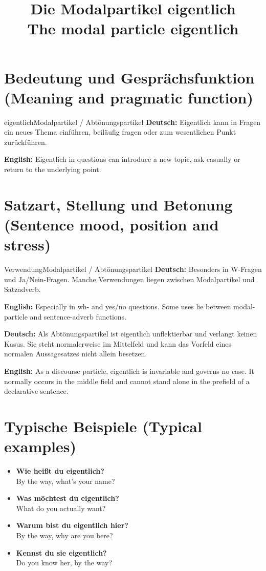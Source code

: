 \documentclass[a4paper,11pt]{article}
\title{Die Modalpartikel \glqq eigentlich\grqq\\{\large\textnormal{The modal particle eigentlich}}}
\date{}
\newcommand{\GermanText}[1]{\textbf{Deutsch: }#1\par}
\newcommand{\EnglishText}[1]{{\small\color{SoftGray}\textbf{English: }#1\par}}
\newcommand{\ExampleItem}[2]{\item \textbf{#1}\\{\small\color{SoftGray}#2}}
\begin{document}
\maketitle
\tableofcontents
\section{Bedeutung und Gesprächsfunktion \textnormal{(Meaning and pragmatic function)}}
\begin{grammarentry}{eigentlich}{Modalpartikel / Abtönungspartikel}
\GermanText{Eigentlich kann in Fragen ein neues Thema einführen, beiläufig fragen oder zum wesentlichen Punkt zurückführen.}
\EnglishText{Eigentlich in questions can introduce a new topic, ask casually or return to the underlying point.}
\end{grammarentry}
\section{Satzart, Stellung und Betonung \textnormal{(Sentence mood, position and stress)}}
\begin{grammarentry}{Verwendung}{Modalpartikel / Abtönungspartikel}
\GermanText{Besonders in W-Fragen und Ja/Nein-Fragen. Manche Verwendungen liegen zwischen Modalpartikel und Satzadverb.}
\EnglishText{Especially in wh- and yes/no questions. Some uses lie between modal-particle and sentence-adverb functions.}
\end{grammarentry}
\GermanText{Als Abtönungspartikel ist eigentlich unflektierbar und verlangt keinen Kasus. Sie steht normalerweise im Mittelfeld und kann das Vorfeld eines normalen Aussagesatzes nicht allein besetzen.}
\EnglishText{As a discourse particle, eigentlich is invariable and governs no case. It normally occurs in the middle field and cannot stand alone in the prefield of a declarative sentence.}
\section{Typische Beispiele \textnormal{(Typical examples)}}
\begin{exbox}\begin{itemize}
\ExampleItem{Wie heißt du eigentlich?}{By the way, what's your name?}
\ExampleItem{Was möchtest du eigentlich?}{What do you actually want?}
\ExampleItem{Warum bist du eigentlich hier?}{By the way, why are you here?}
\ExampleItem{Kennst du sie eigentlich?}{Do you know her, by the way?}
\end{itemize}\end{exbox}
\end{document}
